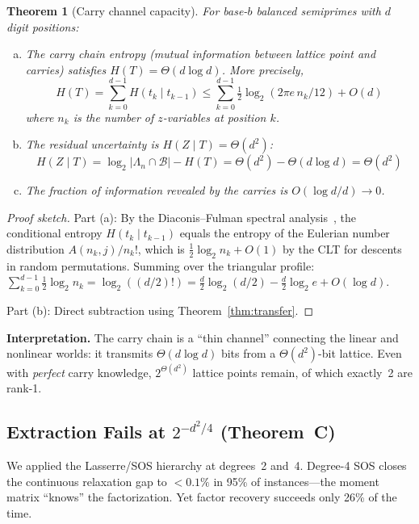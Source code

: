 \documentclass[11pt,a4paper]{article}
\newtheorem{theorem}{Theorem}
\begin{document}
\begin{theorem}[Carry channel capacity]\label{thm:channel}
For base-$b$ balanced semiprimes with $d$ digit positions:
\begin{enumerate}[(a)]
\item The carry chain entropy (mutual information between lattice point and carries) satisfies $H(T) = \Theta(d \log d)$.  More precisely,
\[
H(T) = \sum_{k=0}^{d-1} H(t_k \mid t_{k-1}) \le \sum_{k=0}^{d-1} \tfrac{1}{2}\log_2(2\pi e\, n_k / 12) + O(d)
\]
where $n_k$ is the number of $z$-variables at position $k$.
\item The residual uncertainty is $H(Z \mid T) = \Theta(d^2)$:
\[
H(Z \mid T) = \log_2|\Lambda_n \cap \mathcal{B}| - H(T) = \Theta(d^2) - \Theta(d \log d) = \Theta(d^2)
\]
\item The fraction of information revealed by the carries is $O(\log d / d) \to 0$.
\end{enumerate}
\end{theorem}

\begin{proof}[Proof sketch]
Part (a): By the Diaconis--Fulman spectral analysis~\cite{diaconis09}, the conditional entropy $H(t_k \mid t_{k-1})$ equals the entropy of the Eulerian number distribution $A(n_k, j)/n_k!$, which is $\frac{1}{2}\log_2 n_k + O(1)$ by the CLT for descents in random permutations.  Summing over the triangular profile:
$\sum_{k=0}^{d-1} \frac{1}{2}\log_2 n_k = \log_2((d/2)!) = \frac{d}{2}\log_2(d/2) - \frac{d}{2}\log_2 e + O(\log d)$.

Part (b): Direct subtraction using Theorem~\ref{thm:transfer}.
\end{proof}

\textbf{Interpretation.}  The carry chain is a ``thin channel'' connecting the linear and nonlinear worlds: it transmits $\Theta(d \log d)$ bits from a $\Theta(d^2)$-bit lattice.  Even with \emph{perfect} carry knowledge, $2^{\Theta(d^2)}$ lattice points remain, of which exactly~2 are rank-1.

\subsection{Extraction Fails at $2^{-d^2/4}$ (Theorem~C)}

We applied the Lasserre/SOS hierarchy at degrees~2 and~4.  Degree-4 SOS closes the continuous relaxation gap to $<0.1\%$ in 95\% of instances---the moment matrix ``knows'' the factorization.  Yet factor recovery succeeds only 26\% of the time.
\end{document}
